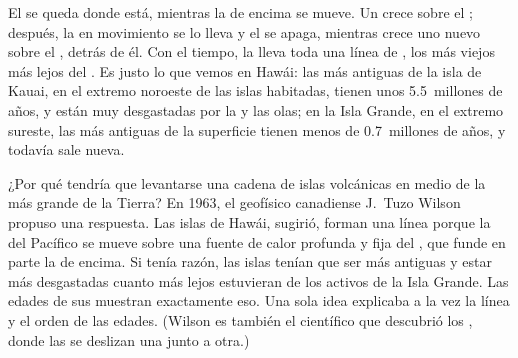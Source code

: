 El  se queda donde está, mientras la  de encima se
mueve. Un  crece sobre el ; después, la  en
movimiento se lo lleva y el  se apaga, mientras crece uno nuevo sobre
el , detrás de él. Con el tiempo, la  lleva toda una
línea de , los más viejos más lejos del . Es justo lo
que vemos en Hawái: las  más antiguas de la isla de Kauai, en el
extremo noroeste de las islas habitadas, tienen unos 5.5~millones de años,
y están muy desgastadas por la  y las olas; en la Isla Grande, en el
extremo sureste, las  más antiguas de la superficie tienen menos de
0.7~millones de años, y todavía sale  nueva.

\begin{history}
¿Por qué tendría que levantarse una cadena de islas volcánicas en medio de
la  más grande de la Tierra? En 1963, el geofísico canadiense
J.~Tuzo Wilson propuso una respuesta. Las islas de Hawái, sugirió, forman
una línea porque la  del Pacífico se mueve sobre una fuente de calor
profunda y fija del , que funde en parte la  de encima. Si tenía
razón, las islas tenían que ser más antiguas y estar más desgastadas cuanto
más lejos estuvieran de los  activos de la Isla Grande. Las edades de sus  muestran exactamente eso. Una sola idea explicaba a la vez la línea y el orden de las edades.
(Wilson es también el científico que descubrió los , donde las  se deslizan una junto a otra.)
\end{history}

